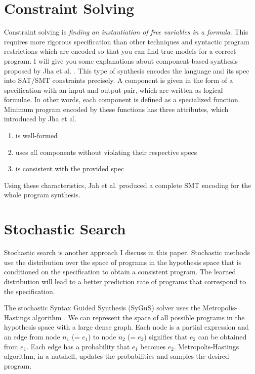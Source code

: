 \documentclass[12pt, a4paper, titlepage]{report}
\begin{document}
  \section{Constraint Solving}
    Constraint solving is \textit{finding an instantiation of free variables in a formula}. This requires more rigorous specification than other techniques and syntactic program restrictions which are encoded so that you can find true models for a correct program.
    I will give you some explanations about component-based synthesis proposed by Jha et al. \cite{jha:2010}.
    This type of synthesis encodes the language and its spec into SAT/SMT constraints precisely. A component is given in the form of a specification with an input and output pair, which are written as logical formulae. In other words, each component is defined as a specialized function.
    Minimum program encoded by these functions has three attributes, which introduced by Jha et al.
    \begin{enumerate}
        \item is well-formed
        \item uses all components without violating their respective specs
        \item is consistent with the provided spec
    \end{enumerate}
    Using these characteristics, Jah et al. produced a complete SMT encoding for the whole program synthesis.

  \section{Stochastic Search}
    Stochastic search is another approach I discuss in this paper.
    Stochastic methods use the distribution over the space of programs in the hypothesis space that is conditioned on the specification to obtain a consistent program.
    The learned distribution will lead to a better prediction rate of programs that correspond to the specification.

    The stochastic Syntax Guided Synthesis (SyGuS) solver uses the Metropolis-Hastings algorithm \cite{alur:2013}.
    We can represent the space of all possible programs in the hypothesis space with a large dense graph.
    Each node is a partial expression and an edge from node $n_1$ (= $e_1$) to node $n_2$ (= $e_2$) signifies that $e_2$ can be obtained from $e_1$.
    Each edge has a probability that $e_1$ becomes $e_2$.
    Metropolis-Hastings algorithm, in a nutshell, updates the probabilities and samples the desired program.
\end{document}
